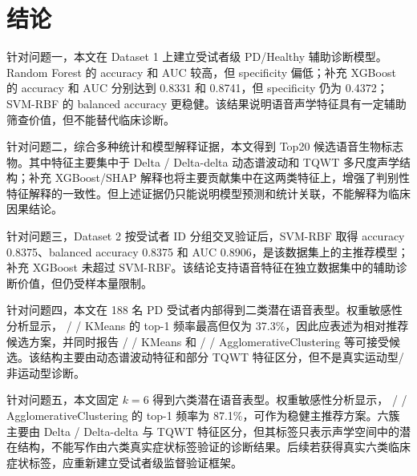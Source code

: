 \section{结论}

针对问题一，本文在 Dataset 1 上建立受试者级 PD/Healthy 辅助诊断模型。Random Forest 的 accuracy 和 AUC 较高，但 specificity 偏低；补充 XGBoost 的 accuracy 和 AUC 分别达到 0.8331 和 0.8741，但 specificity 仍为 0.4372；SVM-RBF 的 balanced accuracy 更稳健。该结果说明语音声学特征具有一定辅助筛查价值，但不能替代临床诊断。

针对问题二，综合多种统计和模型解释证据，本文得到 Top20 候选语音生物标志物。其中特征主要集中于 Delta / Delta-delta 动态谱波动和 TQWT 多尺度声学结构；补充 XGBoost/SHAP 解释也将主要贡献集中在这两类特征上，增强了判别性特征解释的一致性。但上述证据仍只能说明模型预测和统计关联，不能解释为临床因果结论。

针对问题三，Dataset 2 按受试者 ID 分组交叉验证后，SVM-RBF 取得 accuracy 0.8375、balanced accuracy 0.8375 和 AUC 0.8906，是该数据集上的主推荐模型；补充 XGBoost 未超过 SVM-RBF。该结论支持语音特征在独立数据集中的辅助诊断价值，但仍受样本量限制。

针对问题四，本文在 188 名 PD 受试者内部得到二类潜在语音表型。权重敏感性分析显示， /  / KMeans 的 top-1 频率最高但仅为 37.3\%，因此应表述为相对推荐候选方案，并同时报告  /  / KMeans 和  /  / AgglomerativeClustering 等可接受候选。该结构主要由动态谱波动特征和部分 TQWT 特征区分，但不是真实运动型/非运动型诊断。

针对问题五，本文固定 \(k=6\) 得到六类潜在语音表型。权重敏感性分析显示， /  / AgglomerativeClustering 的 top-1 频率为 87.1\%，可作为稳健主推荐方案。六簇主要由 Delta / Delta-delta 与 TQWT 特征区分，但其标签只表示声学空间中的潜在结构，不能写作由六类真实症状标签验证的诊断结果。后续若获得真实六类临床症状标签，应重新建立受试者级监督验证框架。
